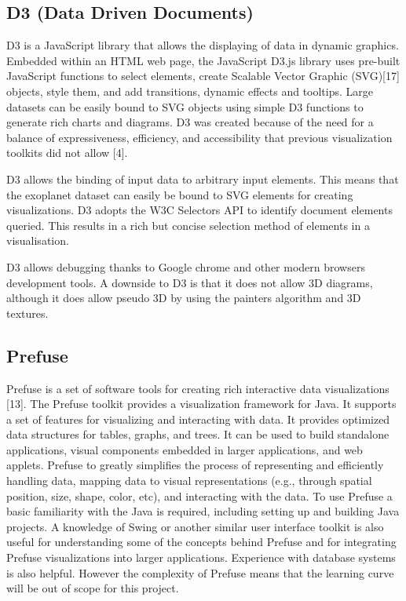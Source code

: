 \subsection{D3 (Data Driven Documents)}
D3 is a JavaScript library that allows the displaying of data in dynamic
graphics. Embedded
within an HTML web page, the JavaScript D3.js library uses pre-built JavaScript
functions to
select elements, create Scalable Vector Graphic (SVG)[17] objects, style them,
and add transitions,
dynamic effects and tooltips. Large datasets can be easily bound to SVG objects
using
simple D3 functions to generate rich charts and diagrams. D3 was created because
of the
need for a balance of expressiveness, efficiency, and accessibility that
previous visualization
toolkits did not allow [4].

D3 allows the binding of input data to arbitrary input elements. This means that
the exoplanet
dataset can easily be bound to SVG elements for creating visualizations. D3
adopts
the W3C Selectors API to identify document elements queried. This results in a
rich but
concise selection method of elements in a visualisation.

D3 allows debugging thanks to Google chrome and other modern browsers
development
tools. A downside to D3 is that it does not allow 3D diagrams, although it does
allow
pseudo 3D by using the painters algorithm and 3D textures.

\subsection{Prefuse}
Prefuse is a set of software tools for creating rich interactive data
visualizations [13]. The
Prefuse toolkit provides a visualization framework for Java. It supports a set
of features
for visualizing and interacting with data. It provides optimized data structures
for tables,
graphs, and trees. It can be used to build standalone applications, visual
components embedded
in larger applications, and web applets. Prefuse to greatly simplifies the
process
of representing and efficiently handling data, mapping data to visual
representations (e.g.,
through spatial position, size, shape, color, etc), and interacting with the
data.
To use Prefuse a basic familiarity with the Java is required, including setting
up and building
Java projects. A knowledge of Swing or another similar user interface toolkit is
also
useful for understanding some of the concepts behind Prefuse and for integrating
Prefuse
visualizations into larger applications. Experience with database systems is
also helpful. 
However the complexity of Prefuse means that the learning curve will be out of
scope for
this project.

